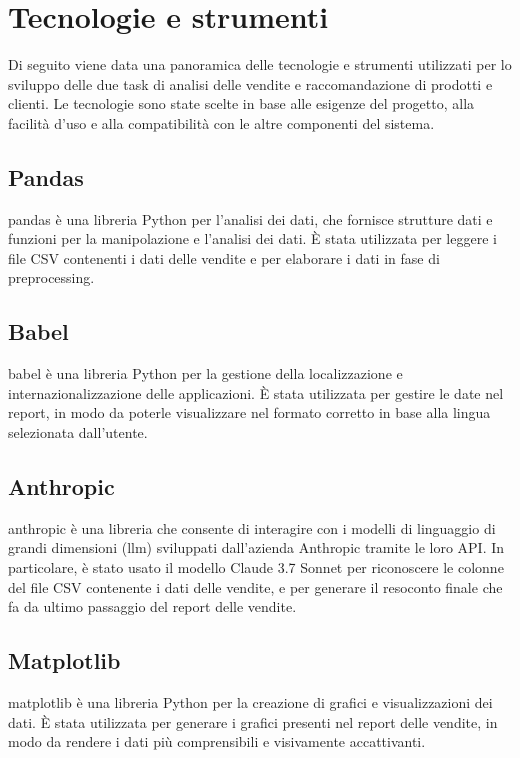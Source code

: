 \section{Tecnologie e strumenti}
\label{sec:tecnologie-strumenti}

Di seguito viene data una panoramica delle tecnologie e strumenti utilizzati per lo sviluppo delle due task di analisi delle vendite e raccomandazione di prodotti e clienti. Le tecnologie sono state scelte in base alle esigenze del progetto, alla facilità d'uso e alla compatibilità con le altre componenti del sistema.

\subsection{Pandas}
\gls{pandas} è una libreria Python per l'analisi dei dati, che fornisce strutture dati e funzioni per la manipolazione e l'analisi dei dati. È stata utilizzata per leggere i file CSV contenenti i dati delle vendite e per elaborare i dati in fase di preprocessing.

\subsection{Babel}
\gls{babel} è una libreria Python per la gestione della localizzazione e internazionalizzazione delle applicazioni. È stata utilizzata per gestire le date nel report, in modo da poterle visualizzare nel formato corretto in base alla lingua selezionata dall'utente.

\subsection{Anthropic}
\gls{anthropic} è una libreria che consente di interagire con i modelli di linguaggio di grandi dimensioni (\gls{llm}) sviluppati dall'azienda Anthropic tramite le loro API. In particolare, è stato usato il modello Claude 3.7 Sonnet per riconoscere le colonne del file CSV contenente i dati delle vendite, e per generare il resoconto finale che fa da ultimo passaggio del report delle vendite.

\subsection{Matplotlib}
\gls{matplotlib} è una libreria Python per la creazione di grafici e visualizzazioni dei dati. È stata utilizzata per generare i grafici presenti nel report delle vendite, in modo da rendere i dati più comprensibili e visivamente accattivanti.

